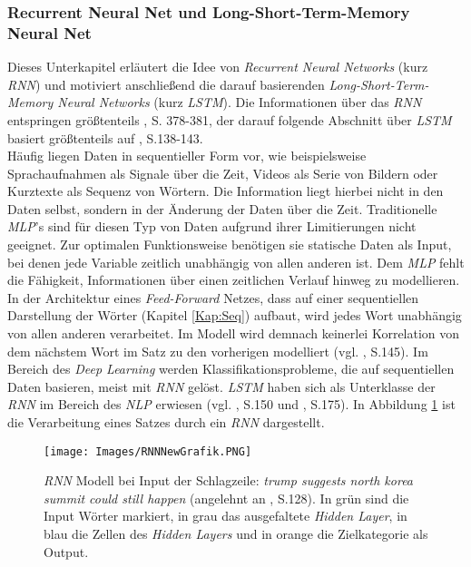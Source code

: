 \documentclass[a4paper,11pt]{article}
\begin{document}
\subsubsection{Recurrent Neural Net und Long-Short-Term-Memory Neural Net} \label{kap:LSTM}

Dieses Unterkapitel erläutert die Idee von \textit{Recurrent Neural Networks} (kurz \textit{RNN}) und motiviert anschließend die darauf basierenden \textit{Long-Short-Term-Memory Neural Networks} (kurz \textit{LSTM}). Die Informationen über das \textit{RNN} entspringen größtenteils \cite{deepL}, S. 378-381, der darauf folgende Abschnitt über \textit{LSTM} basiert größtenteils auf \cite{deepNLP}, S.138-143.\\

Häufig liegen Daten in sequentieller Form vor, wie beispielsweise Sprachaufnahmen als Signale über die Zeit, Videos als Serie von Bildern oder Kurztexte als Sequenz von Wörtern. Die Information liegt hierbei nicht in den Daten selbst, sondern in der Änderung der Daten über die Zeit. Traditionelle \textit{MLP}'s sind für diesen Typ von Daten aufgrund ihrer Limitierungen nicht geeignet. Zur optimalen Funktionsweise benötigen sie statische Daten als Input, bei denen jede Variable zeitlich unabhängig von allen anderen ist. Dem \textit{MLP} fehlt die Fähigkeit, Informationen über einen zeitlichen Verlauf hinweg zu modellieren. In der Architektur eines \textit{Feed-Forward} Netzes, dass auf einer sequentiellen Darstellung der Wörter (Kapitel \ref{Kap:Seq}) aufbaut, wird jedes Wort unabhängig von allen anderen verarbeitet. Im Modell wird demnach keinerlei Korrelation von dem nächstem Wort im Satz zu den vorherigen modelliert (vgl. \cite{deepEssentials}, S.145). Im Bereich des \textit{Deep Learning} werden Klassifikationsprobleme, die auf sequentiellen Daten basieren, meist mit \textit{RNN} gelöst. \textit{LSTM} haben sich als Unterklasse der \textit{RNN} im Bereich des \textit{NLP} erwiesen (vgl. \cite{deepEssentials}, S.150 und \cite{keras}, S.175). In Abbildung \ref{abb:RNNExample} ist die Verarbeitung eines Satzes durch ein \textit{RNN} dargestellt.

\begin{figure}[!ht]
\begin{center}
\texttt{[image: Images/RNNNewGrafik.PNG]}
\caption{\textit{RNN} Modell bei Input der Schlagzeile: \textit{trump suggests north korea summit could still happen} (angelehnt an \cite{deepNLP}, S.128). In grün sind die Input Wörter markiert, in grau das ausgefaltete \textit{Hidden Layer}, in blau die Zellen des \textit{Hidden Layers} und in orange die Zielkategorie als Output.}
\label{abb:RNNExample}
\end{center}
\end{figure}
\end{document}
